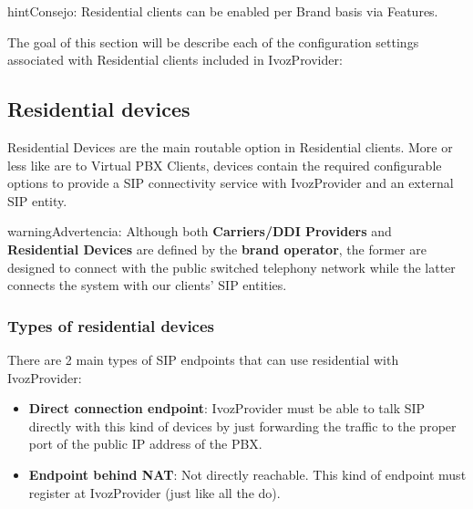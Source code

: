 \documentclass[letterpaper,10pt,spanish]{sphinxmanual}
\begin{document}
\begin{notice}{hint}{Consejo:}
Residential clients can be enabled per Brand basis via Features.
\end{notice}

The goal of this section will be describe each of the configuration settings
associated with Residential clients included in IvozProvider:


\subsection{Residential devices}
\label{administration_portal/client/residential/residential_devices:id1}\label{administration_portal/client/residential/residential_devices::doc}\label{administration_portal/client/residential/residential_devices:residential-devices}
Residential Devices are the main routable option in Residential clients.
More or less like {\hyperref[administration_portal/client/vpbx/routing_endpoints/friends/index:friends]{}} are to Virtual PBX Clients, devices
contain the required configurable options to provide a SIP connectivity
service with IvozProvider and an external SIP entity.

\begin{notice}{warning}{Advertencia:}
Although both \textbf{Carriers/DDI Providers} and \textbf{Residential Devices} are defined by the
\textbf{brand operator}, the former are designed to connect with the public switched telephony network
while the latter connects the system with our clients' SIP entities.
\end{notice}


\subsubsection{Types of residential devices}
\label{administration_portal/client/residential/residential_devices:types-of-residential-devices}
There are 2 main types of SIP endpoints that can use residential with IvozProvider:
\begin{itemize}
\item {} 
\textbf{Direct connection endpoint}: IvozProvider must be able to talk SIP directly with
this kind of devices by just forwarding the traffic to the proper port of
the public IP address of the PBX.

\item {} 
\textbf{Endpoint behind NAT}: Not directly reachable. This kind of endpoint must register at
IvozProvider (just like all the {\hyperref[administration_portal/client/vpbx/terminals:terminals]{}} do).

\end{itemize}
\end{document}
